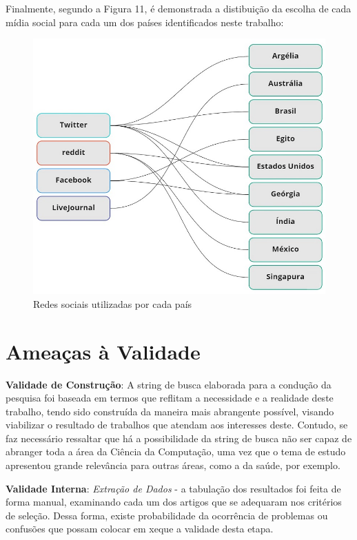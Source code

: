 \documentclass[conference]{IEEEtran}
\begin{document}
Finalmente, segundo a Figura 11, é demonstrada a distibuição da escolha de cada mídia social para cada um dos países identificados neste trabalho:

\begin{figure}[h]
    \centering
\includegraphics[scale=0.4]{images/redes-sociais-por-pais.jpg}
    \caption{Redes sociais utilizadas por cada país}
    \label{fig:redes-sociais-por-pais}
\end{figure}

\section{Ameaças à Validade}
\textbf{Validade de Construção}: A string de busca elaborada para a condução da pesquisa foi baseada em termos que reflitam a necessidade e a realidade deste trabalho, tendo sido construída da maneira mais abrangente possível, visando viabilizar o resultado de trabalhos que atendam aos interesses deste. Contudo, se faz necessário ressaltar que há a possibilidade da string de busca não ser capaz de abranger toda a área da Ciência da Computação, uma vez que o tema de estudo apresentou grande relevância para outras áreas, como a da saúde, por exemplo.

\textbf{Validade Interna}: \textit{Extração de Dados} - a tabulação dos resultados foi feita de forma manual, examinando cada um dos artigos que se adequaram nos critérios de seleção. Dessa forma, existe probabilidade da ocorrência de problemas ou confusões que possam colocar em xeque a validade desta etapa. 
\end{document}
